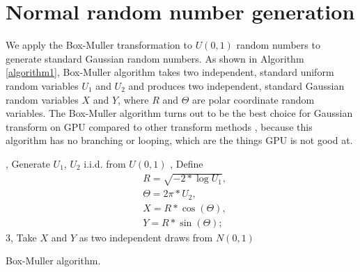 \documentclass[article,nojss]{jss}\usepackage[]{graphicx}\usepackage[]{color}
\begin{document}
\section{Normal random number generation}
We apply the Box-Muller transformation to $U(0,1)$ random numbers to generate standard Gaussian random numbers. As shown in Algorithm \ref{algorithm1}, Box-Muller algorithm takes two independent, standard uniform random variables $U_1$ and $U_2$ and produces two independent, standard Gaussian random variables $X$ and $Y$, where $R$ and $\Theta$ are polar coordinate random variables. %
The Box-Muller algorithm turns out to be the best choice for Gaussian transform on GPU compared to other transform methods \citep{howes2007efficient}, because this algorithm has no branching or looping, which are the things GPU is not good at. %

\begin{algorithm*}[H] \label{algorithm1}
, Generate $U_1$, $U_2$ i.i.d. from $U (0,1)$ , Define \begin{align*} 
& R = \sqrt{-2*\log U_1},\\
&  \Theta = 2\pi*U_2,\\
&  X=R*\cos(\Theta),\\
& Y=R*\sin(\Theta);\;\end{align*}
 3, Take $X$ and $Y$ as two independent draws from $N(0,1)$\;
 \caption{Box-Muller algorithm.}
\end{algorithm*}
\end{document}
